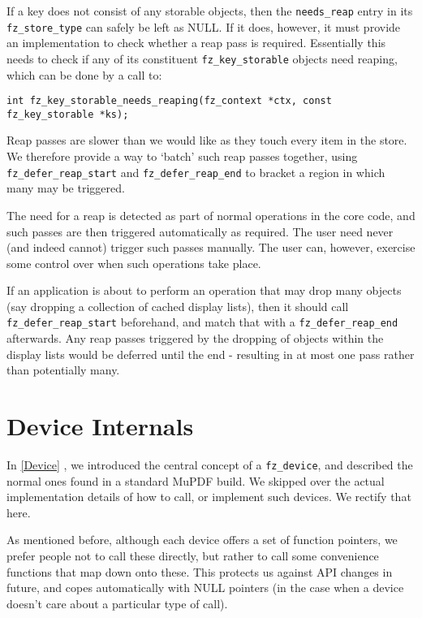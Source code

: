 \documentclass[oneside]{book}
\newcommand{\rjwref}[1] {\autoref{#1} \nameref{#1}}
\begin{document}
If a key does not consist of any storable objects, then the \texttt{needs\_reap} entry in its \texttt{fz\_store\_type} can safely be left as NULL. If it does, however, it must provide an implementation to check whether a reap pass is required. Essentially this needs to check if any of its constituent \texttt{fz\_key\_storable} objects need reaping, which can be done by a call to:

\begin{lstlisting}
int fz_key_storable_needs_reaping(fz_context *ctx, const fz_key_storable *ks);
\end{lstlisting}

Reap passes are slower than we would like as they touch every item in the store. We therefore provide a way to `batch' such reap passes together, using \texttt{fz\_defer\_reap\_start} and \texttt{fz\_defer\_reap\_end} to bracket a region in which many may be triggered.

The need for a reap is detected as part of normal operations in the core code, and such passes are then triggered automatically as required. The user need never (and indeed cannot) trigger such passes manually. The user can, however, exercise some control over when such operations take place.

If an application is about to perform an operation that may drop many objects (say dropping a collection of cached display lists), then it should call \texttt{fz\_defer\_reap\_start} beforehand, and match that with a \texttt{fz\_defer\_reap\_end} afterwards. Any reap passes triggered by the dropping of objects within the display lists would be deferred until the end - resulting in at most one pass rather than potentially many.

\chapter{Device Internals}
\label{DeviceInternals}

In \rjwref{Device}, we introduced the central concept of a \texttt{fz\_device}, and described the normal ones found in a standard MuPDF build. We skipped over the actual implementation details of how to call, or implement such devices. We rectify that here.

As mentioned before, although each device offers a set of function pointers, we prefer people not to call these directly, but rather to call some convenience functions that map down onto these. This protects us against API changes in future, and copes automatically with NULL pointers (in the case when a device doesn't care about a particular type of call).
\end{document}
